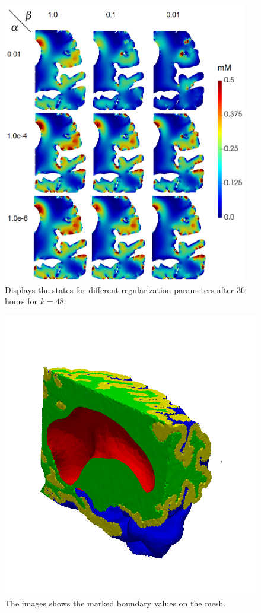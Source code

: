 \documentclass[12pt,a4paper]{article}
\begin{document}
\begin{figure}
\centering
\includegraphics[width=0.95\textwidth]{../Statecomparison36h-pinta.png} 
\caption{ Displays the states for different regularization parameters after 36 hours for $k=48$.}
\label{statecomparison}
\end{figure}

 
 \begin{figure}
\centering
\includegraphics[scale=0.3]{../facetfucntion.png} 
\caption{The images shows the marked boundary values on the mesh. }
\label{markedboundaryvalues}
\end{figure}
\end{document}
